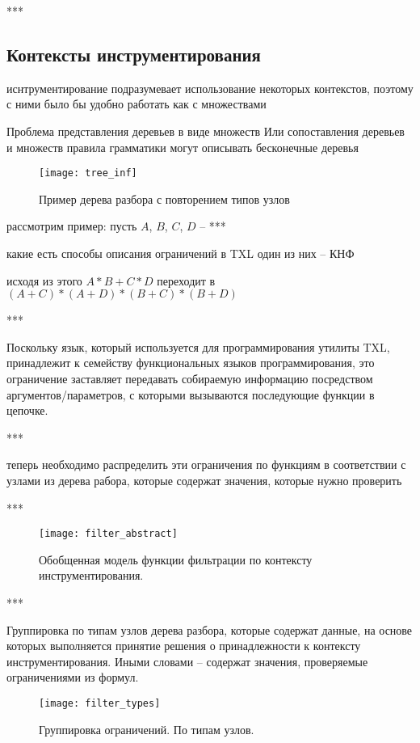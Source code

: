 ***

\subsection{Контексты инструментирования}

иснтрументирование подразумевает использование некоторых контекстов, поэтому с ними было бы удобно работать как с множествами

Проблема представления деревьев в виде множеств
Или сопоставления деревьев и множеств
правила грамматики могут описывать бесконечные деревья

\begin{figure}[H]
	\centering
	\texttt{[image: tree\_inf]}
	\caption{Пример дерева разбора с повторением типов узлов}
	\label{fig:tree_inf}
\end{figure}

рассмотрим пример: пусть $A$, $B$, $C$, $D$ -- ***

какие есть способы описания ограничений в TXL
один из них -- КНФ

исходя из этого
$A * B + C * D$
переходит в
$(A + C) * (A + D) * (B + C) * (B + D)$

***

Поскольку язык, который используется для программирования утилиты TXL, принадлежит к семейству функциональных языков программирования, это ограничение заставляет передавать собираемую информацию посредством аргументов/параметров, с которыми вызываются последующие функции в цепочке.

***

теперь необходимо распределить эти ограничения по функциям в соответствии с узлами из дерева рабора, которые содержат значения, которые нужно проверить

***

\begin{figure}[H]
	\centering
	\texttt{[image: filter\_abstract]}
	\caption{Обобщенная модель функции фильтрации по контексту инструментирования.}
	\label{fig:filter_abstract}
\end{figure}

***

Группировка по типам узлов дерева разбора, которые содержат данные, на основе которых выполняется принятие решения о принадлежности к контексту инструментирования. Иными словами -- содержат значения, проверяемые ограничениями из формул.

\begin{figure}[H]
	\centering
	\texttt{[image: filter\_types]}
	\caption{Группировка ограничений. По типам узлов.}
	\label{fig:filter_types}
\end{figure}

